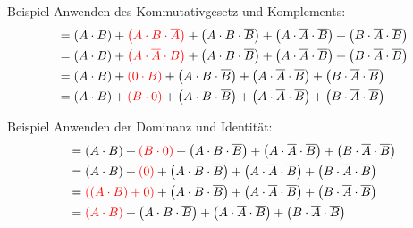 \documentclass[12pt%
,aspectratio=169%
]{beamer}
\begin{document}
\begin{frame}{Beispiel}
Anwenden des Kommutativgesetz und Komplements:
\begin{align*}
&= \left(A \cdot B\right) + \textcolor{red}{\left(A \cdot B \cdot \overline{A}\right)} + \left(A \cdot B \cdot \overline{B}\right) + \left(A \cdot \overline{A} \cdot \overline{B}\right) + \left(B \cdot \overline{A} \cdot \overline{B}\right) \\
&= \left(A \cdot B\right) + \textcolor{red}{\left(A \cdot \overline{A} \cdot B\right)} + \left(A \cdot B \cdot \overline{B}\right) + \left(A \cdot \overline{A} \cdot \overline{B}\right) + \left(B \cdot \overline{A} \cdot \overline{B}\right)\\
&= \left(A \cdot B\right) + \textcolor{red}{\left(0 \cdot B\right)} + \left(A \cdot B \cdot \overline{B}\right) + \left(A \cdot \overline{A} \cdot \overline{B}\right) + \left(B \cdot \overline{A} \cdot \overline{B}\right)\\
& = \left(A \cdot B\right) + \textcolor{red}{\left(B \cdot 0\right)} + \left(A \cdot B \cdot \overline{B}\right) + \left(A \cdot \overline{A} \cdot \overline{B}\right) + \left(B \cdot \overline{A} \cdot \overline{B}\right)
\end{align*}
\end{frame}

\begin{frame}{Beispiel}
Anwenden der Dominanz und Identität:
\begin{align*}
&= \left(A \cdot B\right) + \textcolor{red}{\left(B \cdot 0\right)} + \left(A \cdot B \cdot \overline{B}\right) + \left(A \cdot \overline{A} \cdot \overline{B}\right) + \left(B \cdot \overline{A} \cdot \overline{B}\right)\\
&= \left(A \cdot B\right) + \textcolor{red}{\left(0\right)} + \left(A \cdot B \cdot \overline{B}\right) + \left(A \cdot \overline{A} \cdot \overline{B}\right) + \left(B \cdot \overline{A} \cdot \overline{B}\right)\\
&= \textcolor{red}{\left(\left(A \cdot B\right) + 0\right)} + \left(A \cdot B \cdot \overline{B}\right) + \left(A \cdot \overline{A} \cdot \overline{B}\right) + \left(B \cdot \overline{A} \cdot \overline{B}\right)\\
&= \textcolor{red}{\left(A \cdot B\right)} + \left(A \cdot B \cdot \overline{B}\right) + \left(A \cdot \overline{A} \cdot \overline{B}\right) + \left(B \cdot \overline{A} \cdot \overline{B}\right)
\end{align*}
\end{frame}
\end{document}

